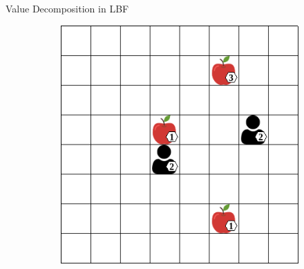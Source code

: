 \begin{frame}[t]{Value Decomposition in LBF}
    \begin{figure}
        \centering
        \begin{subfigure}{.39\textwidth}
            \centering
            \includegraphics[width=.8\textwidth]{images/environments/lbf/lbf-8x8-2p-3f.png}
        \end{subfigure}
    \end{figure}
\end{frame}


